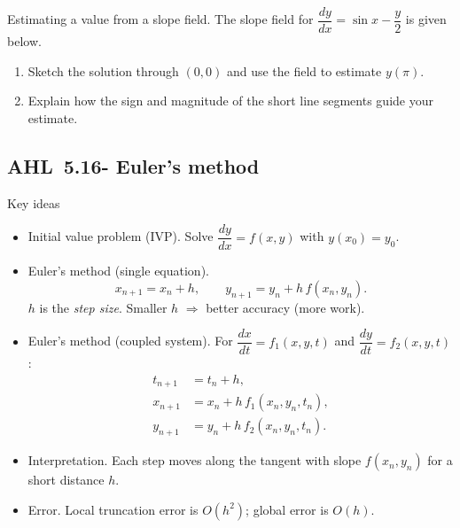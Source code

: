 \documentclass[11pt]{article}
\def\textbf#1{#1}%
\newcommand{\tocsubsection}[1]{\subsection{#1}}
\newcounter{question}
\begin{document}
\begin{question}
\textbf{Estimating a value from a slope field.}
The slope field for $\dfrac{dy}{dx}=\sin x-\dfrac{y}{2}$ is given below.
\begin{enumerate}
  \item Sketch the solution through $(0,0)$ and use the field to estimate $y(\pi)$.
  \item Explain how the sign and magnitude of the short line segments guide your estimate.
\end{enumerate}

\begin{center}
\end{center}
\end{question}




\tocsubsection{AHL 5.16- Euler's method}




\textbf{Key ideas}
\begin{itemize}
  \item \textbf{Initial value problem (IVP).}  Solve $\dfrac{dy}{dx}=f(x,y)$ with $y(x_0)=y_0$.
  \item \textbf{Euler’s method (single equation).}
        \[
        x_{n+1}=x_n+h,\qquad
        y_{n+1}=y_n+h\,f(x_n,y_n).
        \]
        $h$ is the \emph{step size}. Smaller $h$ $\Rightarrow$ better accuracy (more work).
  \item \textbf{Euler’s method (coupled system).}  For
        $\dfrac{dx}{dt}=f_1(x,y,t)$ and $\dfrac{dy}{dt}=f_2(x,y,t)$:
        \[
        \begin{aligned}
          t_{n+1}&=t_n+h,\\
          x_{n+1}&=x_n+h\,f_1(x_n,y_n,t_n),\\
          y_{n+1}&=y_n+h\,f_2(x_n,y_n,t_n).
        \end{aligned}
        \]
  \item \textbf{Interpretation.}  Each step moves along the tangent with slope $f(x_n,y_n)$ for a short distance $h$.
  \item \textbf{Error.}  Local truncation error is $O(h^2)$; global error is $O(h)$.
\end{itemize}
\end{document}
